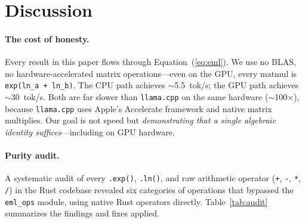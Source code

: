 \documentclass[acmsmall,nonacm]{acmart}
\begin{document}
\section{Discussion}
\label{sec:discussion}

\paragraph{The cost of honesty.}
Every result in this paper flows through Equation~(\ref{eq:eml}).  We
use no BLAS, no hardware-accelerated matrix operations---even on
the GPU, every matmul is \texttt{exp(ln\_a + ln\_b)}.
The CPU path achieves $\sim$5.5~tok/s; the GPU path achieves
$\sim$30~tok/s.  Both are far slower than \texttt{llama.cpp} on the
same hardware ($\sim$100$\times$), because \texttt{llama.cpp} uses
Apple's Accelerate framework and native matrix multiplies.
Our goal is not speed but \emph{demonstrating that a single algebraic
identity suffices}---including on GPU hardware.

\paragraph{Purity audit.}
A systematic audit of every \texttt{.exp()}, \texttt{.ln()}, and raw
arithmetic operator (\texttt{+}, \texttt{-}, \texttt{*}, \texttt{/}) in
the Rust codebase revealed six categories of operations that bypassed
the \texttt{eml\_ops} module, using native Rust operators directly.
Table~\ref{tab:audit} summarizes the findings and fixes applied.
\end{document}
